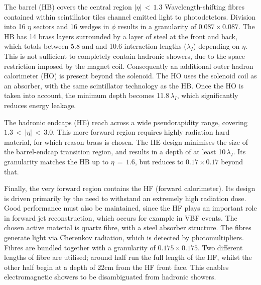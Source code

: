 The barrel (HB) covers the central region $|\eta|\,<\,1.3$
Wavelength-shifting fibres contained within scintillator tiles channel emitted light to photodetetors.
Division into 16 $\eta$ sectors and 16 wedges in $\phi$ results in a granularity of $0.087\times0.087$.
The HB has 14 brass layers surrounded by a layer of steel at the front and back, 
which totals between 5.8 and and 10.6 interaction lengths ($\lambda_I$) depending on $\eta$. %
This is not sufficient to completely contain hadronic showers, due to the space restriction imposed by the magnet coil.
Consequently an additional outer hadron calorimeter (HO) is present beyond the solenoid.
The HO uses the solenoid coil as an absorber, with the same scintillator technology as the HB.
Once the HO is taken into account, the minimum depth becomes 11.8\,$\lambda_I$, 
which significantly reduces energy leakage. %

The hadronic endcaps (HE) reach across a wide pseudorapidity range, covering $1.3\,<\,|\eta|\,<\,3.0$.
This more forward region requires highly radiation hard material, for which reason brass is chosen. %
The HE design minimises the size of the barrel-endcap transition region, and results in a depth of at least 10\,$\lambda_I$.
Its granularity matches the HB up to $\eta\,=\,1.6$, but reduces to $0.17\times0.17$ beyond that.

Finally, the very forward region contains the HF (forward calorimeter).
Its design is driven primarily by the need to withstand an extremely high radiation dose.
Good performance must also be maintained, since the HF plays an important role in forward jet reconstruction, which occurs for example in VBF \Hgg events.
The chosen active material is quartz fibre, with a steel absorber structure.
The fibres generate light via Cherenkov radiation, which is detected by photomultipliers.
Fibres are bundled together with a granularity of $0.175\times0.175$.
Two different lengths of fibre are utilised; 
around half run the full length of the HF, whilst the other half begin at a depth of 22cm from the HF front face.
This enables electromagnetic showers to be disambiguated from hadronic showers.

